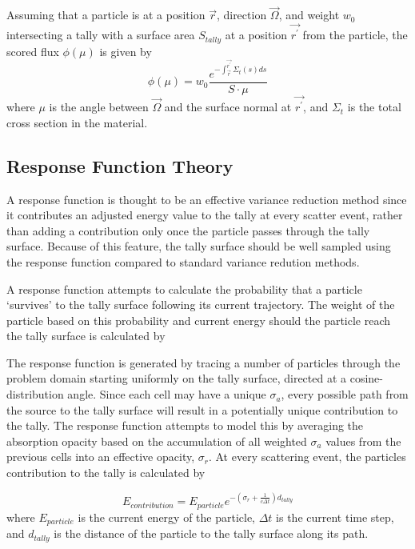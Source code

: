\documentclass[]{article}
\begin{document}
		Assuming that a particle is at a position $\vec{r}$, direction $\vec{\Omega}$, and weight $w_{0}$ intersecting a tally with a surface area $S_{tally}$ at a position $\vec{r^{\prime}}$ from the particle, the scored flux $\phi(\mu)$ is given by
		\begin{equation}
			\phi(\mu) = w_{0} \frac{e^{-\int_{\vec{r}}^{\vec{r^{\prime}}} \Sigma_{t}(s)ds}}{S \cdot \mu}
		\end{equation}
		where $\mu$ is the angle between $\vec{\Omega}$ and the surface normal at $\vec{r^{\prime}}$, and $\Sigma_{t}$ is the total cross section in the material.

	\subsection{Response Function Theory}
		A response function is thought to be an effective variance reduction method since it contributes an adjusted energy value to the tally at every scatter event, rather than adding a contribution only once the particle passes through the tally surface. Because of this feature, the tally surface should be well sampled using the response function compared to standard variance redution methods.

		A response function attempts to calculate the probability that a particle `survives' to the tally surface following its current trajectory. The weight of the particle based on this probability and current energy should the particle reach the tally surface is calculated by

		The response function is generated by tracing a number of particles through the problem domain starting uniformly on the tally surface, directed at a cosine-distribution angle. Since each cell may have a unique $\sigma_{a}$, every possible path from the source to the tally surface will result in a potentially unique contribution to the tally. The response function attempts to model this by averaging the absorption opacity based on the accumulation of all weighted $\sigma_{a}$ values from the previous cells into an effective opacity, $\sigma_{r}$. At every scattering event, the particles contribution to the tally is calculated by

		\begin{equation}\label{Eq: tally_contr}
		E_{contribution} = E_{particle}e^{-(\sigma_{r} + \frac{1}{c \Delta t})d_{tally}}
		\end{equation}
		where $E_{particle}$ is the current energy of the particle, $\Delta t$ is the current time step, and $d_{tally}$ is the distance of the particle to the tally surface along its path.
\end{document}
